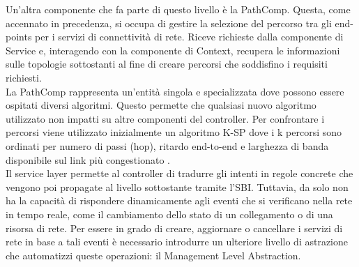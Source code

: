 Un'altra componente che fa parte di questo livello è la PathComp. Questa, come accennato in precedenza, si occupa di gestire la selezione del percorso tra gli end-points per i servizi di connettività di rete. 
Riceve richieste dalla componente di Service e, interagendo con la componente di Context, recupera le informazioni sulle topologie sottostanti al fine di creare
percorsi che soddisfino i requisiti richiesti.
\\La PathComp rappresenta un'entità singola e specializzata dove possono essere ospitati diversi algoritmi. Questo permette che qualsiasi nuovo algoritmo utilizzato non impatti su altre componenti del controller.
Per confrontare i percorsi viene utilizzato inizialmente un algoritmo K-SP dove i k percorsi sono ordinati per numero di passi (hop), ritardo end-to-end e larghezza di banda disponibile sul link più congestionato \cite{D53}. 
\\Il service layer permette al controller di tradurre gli intenti in regole concrete che vengono poi propagate al livello sottostante tramite l'SBI.
Tuttavia, da solo non ha la capacità di rispondere dinamicamente agli eventi che si verificano nella rete in tempo reale, come il cambiamento dello stato di un collegamento o di una risorsa di rete. %
Per essere in grado di creare, aggiornare o cancellare i servizi di rete in base a tali eventi è necessario introdurre un ulteriore livello di astrazione che automatizzi queste operazioni: il Management Level Abstraction.

